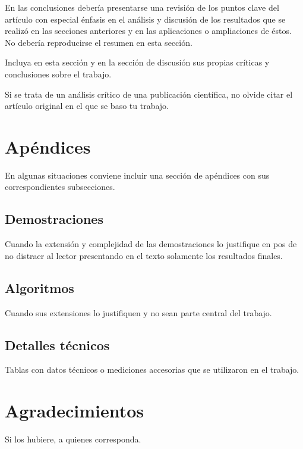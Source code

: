 \documentclass[conference,a4paper,10pt,oneside,final]{tfmpd}
\begin{document}
	En las conclusiones debería presentarse una revisión de los puntos
	clave del artículo con especial énfasis en el análisis y discusión
	de los resultados que se realizó en las secciones anteriores y en las
	aplicaciones o ampliaciones de éstos. No debería reproducirse el resumen
	en esta sección.

	Incluya en esta sección y en la sección de discusión sus propias críticas
	y conclusiones sobre el trabajo.

	Si se trata de un análisis crítico de una publicación científica, no
	olvide citar el artículo original en el que se baso tu trabajo.

\section{Apéndices}

	En algunas situaciones conviene incluir una sección de apéndices con
	sus correspondientes subsecciones.

	\subsection{Demostraciones}

		Cuando la extensión y complejidad de las demostraciones lo justifique
		en pos de no distraer al lector presentando en el texto solamente los
		resultados finales.

	\subsection{Algoritmos}

		Cuando sus extensiones lo justifiquen y no sean parte central del trabajo.

	\subsection{Detalles técnicos}

		Tablas con datos técnicos o mediciones accesorias que se utilizaron en
		el trabajo.

\section*{Agradecimientos}

	Si los hubiere, a quienes corresponda.

\nocite{*}  
\end{document}
